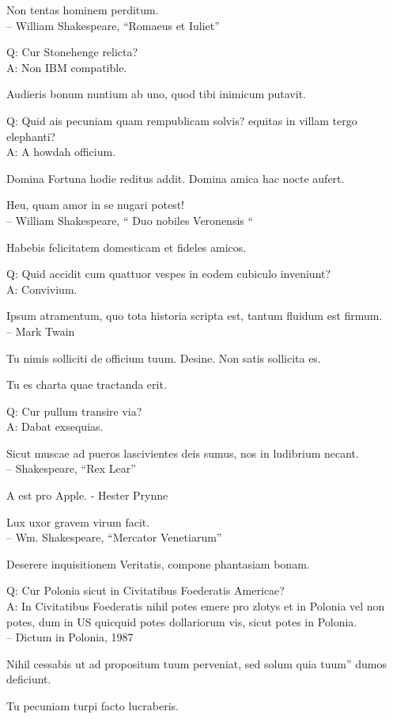 \documentclass[titlepage,12pt]{memoir}
\begin{document}
Non tentas hominem perditum.
\\-- William Shakespeare, “Romaeus et Iuliet”

Q: Cur Stonehenge relicta?\\
A: Non IBM compatible.

Audieris bonum nuntium ab uno, quod tibi inimicum putavit.

Q: Quid ais pecuniam quam rempublicam solvis?
equitas in villam tergo elephanti?\\
A: A howdah officium.

Domina Fortuna hodie reditus addit. Domina amica hac nocte aufert.

Heu, quam amor in se nugari potest!
\\-- William Shakespeare, “ Duo nobiles Veronensis “

 Habebis felicitatem domesticam et fideles amicos.

Q: Quid accidit cum quattuor vespes in eodem cubiculo inveniunt?\\
A: Convivium.

Ipsum atramentum, quo tota historia scripta est, tantum fluidum est firmum.
\\-- Mark Twain

Tu nimis solliciti de officium tuum. Desine. Non satis sollicita es.

Tu es charta quae tractanda erit.

Q: Cur pullum transire via?\\
A: Dabat exsequias.

Sicut muscae ad pueros lascivientes deis sumus, nos in ludibrium necant.
\\-- Shakespeare, “Rex Lear”

A est pro Apple. - Hester Prynne

Lux uxor gravem virum facit.
\\-- Wm. Shakespeare, “Mercator Venetiarum”

Deserere inquisitionem Veritatis, compone phantasiam bonam.

Q: Cur Polonia sicut in Civitatibus Foederatis Americae?\\
A: In Civitatibus Foederatis nihil potes emere pro zlotys et in
Polonia vel non potes, dum in US quicquid potes
dollariorum vis, sicut potes in Polonia.
\\-- Dictum in Polonia, 1987

Nihil cessabis ut ad propositum tuum perveniat, sed solum quia tuum”
dumos deficiunt.

Tu pecuniam turpi facto lucraberis.
\end{document}
